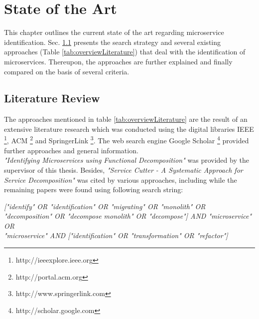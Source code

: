 

\chapter{State of the Art}
\label{ch:StateOfTheArt}
This chapter outlines the current state of the art regarding microservice identification.  Sec. \ref{sec:StateOfTheArt:LiteratureReview} presents the search strategy and several existing approaches (Table \ref{tab:overviewLiterature}) that deal with the identification of microservices. Thereupon, the approaches are further explained and finally compared on the basis of several criteria.

\section{Literature Review}
\label{sec:StateOfTheArt:LiteratureReview}
The approaches mentioned in table \ref{tab:overviewLiterature} are the result of an extensive literature research which was conducted using the digital libraries IEEE \footnote{http://ieeexplore.ieee.org }, ACM \footnote{http://portal.acm.org} and SpringerLink \footnote{http://www.springerlink.com }. The web search engine Google Scholar \footnote{http://scholar.google.com} provided further approaches and general information. \\ 
\textit{"Identifying Microservices using Functional Decomposition"} \cite{FunctionalDecompositionHeinrich} was provided by the supervisor of this thesis. Besides, \textit{"Service Cutter - A Systematic Approach for Service Decomposition"} \cite{ServiceCutter} was cited by various approaches, including \cite{interfaceAnalysisBaresi} while the remaining papers were found using following search string: 

\vspace{1cm}
\begin{centering}
{\itshape
   ["identify" OR "identification" OR "migrating" OR "monolith" OR "decomposition" OR "decompose monolith"
  	OR "decompose"] AND  "microservice"  \\
  	   OR \\  "microservice"  AND ["identification" OR "transformation" OR "refactor"]
} \\

 
   
\end{centering}
\vspace{1cm}

